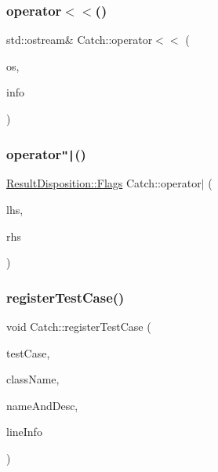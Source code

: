 \subsubsection{\texorpdfstring{operator$<$$<$()}{operator<<()}}
{\footnotesize\ttfamily std\+::ostream\& Catch\+::operator$<$$<$ (\begin{DoxyParamCaption}\item[{std\+::ostream \&}]{os,  }\item[{\hyperlink{struct_catch_1_1_source_line_info}{Source\+Line\+Info} const \&}]{info }\end{DoxyParamCaption})}

\hypertarget{namespace_catch_ab32a083e442cc09f736327d2e2865999}{}\label{namespace_catch_ab32a083e442cc09f736327d2e2865999} 
\subsubsection{\texorpdfstring{operator\texttt{"|}()}{operator|()}}
{\footnotesize\ttfamily \hyperlink{struct_catch_1_1_result_disposition_a3396cad6e2259af326b3aae93e23e9d8}{Result\+Disposition\+::\+Flags} Catch\+::operator$\vert$ (\begin{DoxyParamCaption}\item[{\hyperlink{struct_catch_1_1_result_disposition_a3396cad6e2259af326b3aae93e23e9d8}{Result\+Disposition\+::\+Flags}}]{lhs,  }\item[{\hyperlink{struct_catch_1_1_result_disposition_a3396cad6e2259af326b3aae93e23e9d8}{Result\+Disposition\+::\+Flags}}]{rhs }\end{DoxyParamCaption})\hspace{0.3cm}{\ttfamily [inline]}}

\hypertarget{namespace_catch_a9a59d681cc327a33c280796561dfe258}{}\label{namespace_catch_a9a59d681cc327a33c280796561dfe258} 
\subsubsection{\texorpdfstring{register\+Test\+Case()}{registerTestCase()}}
{\footnotesize\ttfamily void Catch\+::register\+Test\+Case (\begin{DoxyParamCaption}\item[{\hyperlink{struct_catch_1_1_i_test_case}{I\+Test\+Case} $\ast$}]{test\+Case,  }\item[{char const $\ast$}]{class\+Name,  }\item[{\hyperlink{struct_catch_1_1_name_and_desc}{Name\+And\+Desc} const \&}]{name\+And\+Desc,  }\item[{\hyperlink{struct_catch_1_1_source_line_info}{Source\+Line\+Info} const \&}]{line\+Info }\end{DoxyParamCaption})}

